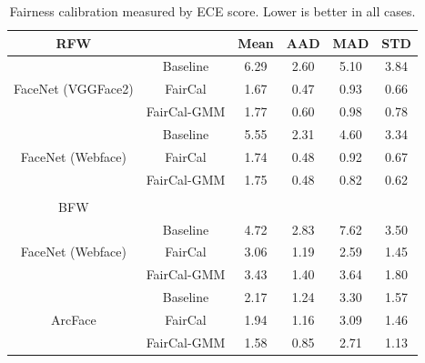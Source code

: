 \begin{table}
\centering
\footnotesize
\begin{tabular}{c c cccc}
\toprule
RFW && Mean & AAD & MAD & STD \\
\midrule
\multirow{3}{5em}{FaceNet (VGGFace2)} 
& Baseline    &  6.29  &  2.60  &  5.10  &  3.84  \\
& FairCal     &  1.67  &  0.47  &  0.93  &  0.66  \\
& FairCal-GMM &  1.77  &  0.60  &  0.98  &  0.78  \\
\hline
\multirow{3}{5em}{FaceNet (Webface)}
& Baseline    &  5.55  &  2.31  &  4.60  &  3.34  \\
& FairCal     &  1.74  &  0.48  &  0.92  &  0.67  \\
& FairCal-GMM &  1.75  &  0.48  &  0.82  &  0.62  \\
\midrule
\\
BFW & & & & &  \\
\midrule
\multirow{3}{5em}{FaceNet (Webface)} 
& Baseline    &  4.72  &  2.83  &  7.62  &  3.50  \\
& FairCal     &  3.06  &  1.19  &  2.59  &  1.45  \\
& FairCal-GMM &  3.43  &  1.40  &  3.64  &  1.80  \\
\hline
\multirow{3}{5em}{ArcFace} 
& Baseline    &  2.17  &  1.24  &  3.30  &  1.57  \\
& FairCal     &  1.94  &  1.16  &  3.09  &  1.46  \\
& FairCal-GMM &  1.58  &  0.85  &  2.71  &  1.13  \\
\bottomrule
\end{tabular}
\caption{Fairness calibration measured by ECE score. Lower is better in all cases.}
\label{tab:ECE}
\end{table}

